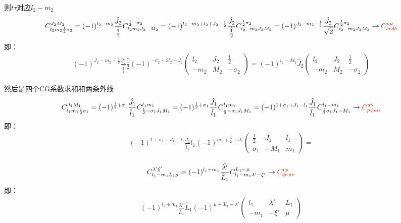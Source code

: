 \documentclass[a4paper]{article}
\newcommand{\red}{\color{red}}
\begin{document}
则$t\tau$对应$l_{2}-m_{2}$
\begin{align}
C_{l_{2}m_{2}\frac{1}{2}\sigma_{2}}^{J_{2}M_{2}}=(-1)^{l_{2}-m_{2}}\frac{\hat{J}_{2}}{\hat{\frac{1}{2}}}C_{l_{2}m_{2}J_{2}-M_{2}}^{\frac{1}{2}-\sigma_{2}}=(-1)^{l_{2}-m_{2}+l_{2}+J_{2}-\frac{1}{2}}\frac{\hat{J}_{2}}{\hat{\frac{1}{2}}}C_{l_{2}-m_{2}J_{2}M_{2}}^{\frac{1}{2}\sigma_{2}}=(-1)^{J_{2}-m_{2}-\frac{1}{2}}\frac{\hat{J}_{2}}{\sqrt{2}}C_{l_{2}-m_{2}J_{2}M_{2}}^{\frac{1}{2}\sigma_{2}}\rightarrow{\red C_{t\tau d\delta}^{v\mu}}
\end{align}
即：
\begin{align}
(-1)^{J_{2}-m_{2}-\frac{1}{2}}\frac{\hat{J}_{2}}{\hat{\frac{1}{2}}}\hat{\frac{1}{2}}(-1)^{-\sigma_{2}+3l_{2}+J_{2}}\left(\begin{array}{ccc}l_{2}&J_{2}&\frac{1}{2}\\-m_{2}&M_{2}&-\sigma_{2}\end{array}\right)= (-1)^{l_{2}-M_{2}}\hat{J}_{2}\left(\begin{array}{ccc}l_{2}&J_{2}&\frac{1}{2}\\-m_{2}&M_{2}&-\sigma_{2}\end{array}\right)
\end{align}

然后是四个CG系数求和和两条外线
\begin{align}
C_{l_{1}m_{1}\frac{1}{2}\sigma_{1}}^{J_{1}M_{1}}=(-1)^{\frac{1}{2}+\sigma_{1}}\frac{\hat{J}_{1}}{\hat{l}_{1}}C_{\frac{1}{2}-\sigma_{1}J_{1}M_{1}}^{l_{1}m_{1}}=(-1)^{\frac{1}{2}+\sigma_{1}}\frac{\hat{J}_{1}}{\hat{l}_{1}}C_{\frac{1}{2}-\sigma_{1}J_{1}M_{1}}^{l_{1}m_{1}}=(-1)^{1+\sigma_{1}+J_{1}-l_{1}}\frac{\hat{J}_{1}}{\hat{l}_{1}}C_{\frac{1}{2}\sigma_{1}J_{1}-M_{1}}^{l_{1}-m_{1}}\rightarrow{\red C_{p\psi a\alpha}^{q\kappa}}
\end{align}
即：
\begin{align}
(-1)^{1+\sigma_{1}+J_{1}-l_{1}}\frac{\hat{J}_{1}}{\hat{l}_{1}}\hat{l}_{1}(-1)^{m_{1}+\frac{3}{2}+J_{1}}\left(\begin{array}{ccc}\frac{1}{2}&J_{1}&l_{1}\\ \sigma_{1}&-M_{1}&m_{1}\end{array}\right)=
\end{align}

\begin{align}
C_{l_{1}-m_{1}L_{1}\mu}^{\lambda'\xi'}=(-1)^{l_{1}+m_{1}}\frac{\hat{\lambda'}}{\hat{L}_{1}}C_{l_{1}-m_{1}\lambda'-\xi'}^{L_{1}-\mu}\rightarrow{\red C_{q\kappa u\nu}^{r\rho}}
\end{align}
即：
\begin{align}
(-1)^{l_{1}+m_{1}}\frac{\hat{\lambda'}}{\hat{L}_{1}}\hat{L}_{1}(-1)^{\mu+3l_{1}+\lambda'}\left(\begin{array}{ccc}l_{1}&\lambda'&L_{1}\\-m_{1}&-\xi'&\mu\end{array}\right)
\end{align}
\end{document}
